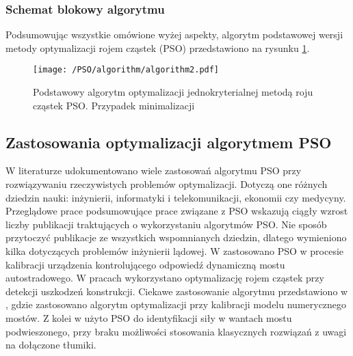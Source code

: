 \subsubsection{Schemat blokowy algorytmu}
Podsumowując wszystkie omówione wyżej aspekty, algorytm podstawowej wersji metody optymalizacji rojem cząstek (PSO) przedstawiono na rysunku \ref{fig: pso_single_algorith}.
\begin{figure}[hbt!]
	\centering
	\texttt{[image: /PSO/algorithm/algorithm2.pdf]} 
	\captionsetup{justification=centering}
	\caption{Podstawowy algorytm optymalizacji jednokryterialnej metodą roju cząstek PSO. Przypadek minimalizacji}
	\label{fig: pso_single_algorith}
\end{figure}

\subsection{Zastosowania optymalizacji algorytmem PSO}
W literaturze udokumentowano wiele zastosowań algorytmu PSO przy rozwiązywaniu rzeczywistych problemów optymalizacji. Dotyczą one różnych dziedzin nauki: inżynierii, informatyki i telekomunikacji, ekonomii czy medycyny. Przeglądowe prace podsumowujące prace związane z PSO \cite{Atyabi2011,CoelloCoello2006,Lalwani2013} wskazują ciągły wzrost liczby publikacji traktujących o wykorzystaniu algorytmów PSO. Nie sposób przytoczyć publikacje ze wszystkich wspomnianych dziedzin, dlatego wymieniono kilka dotyczących problemów inżynierii lądowej. W \cite{Hughes2018} zastosowano PSO w procesie kalibracji urządzenia kontrolującego odpowiedź dynamiczną mostu autostradowego. W pracach \cite{Seyedpoor2011,Kang2012,Wei2018} wykorzystano optymalizację rojem cząstek przy detekcji uszkodzeń konstrukcji. Ciekawe zastosowanie algorytmu przedstawiono w \cite{Tran-Ngoc2018,Qin2018}, gdzie zastosowano algorytm optymalizacji przy kalibracji modelu numerycznego mostów. Z kolei w \cite{Dan2015} użyto PSO do identyfikacji siły w wantach mostu podwieszonego, przy braku możliwości stosowania klasycznych rozwiązań z uwagi na dołączone tłumiki.

